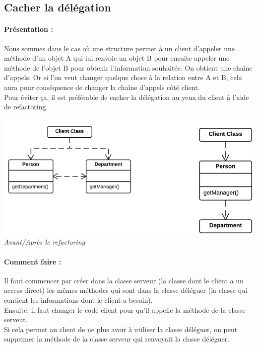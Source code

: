 \documentclass[a4paper,twoside,12pt,openright]{report}
\begin{document}
\newpage

\subsection{Cacher la délégation}
\paragraph{Présentation :}
Nous sommes dans le cas où une structure permet à un client d'appeler une méthode d'un objet A qui lui renvoie un objet B pour ensuite appeler une méthode de l'objet B pour obtenir l'information souhaitée. On obtient une chaîne d'appels. Or si l'on veut changer quelque chose à la relation entre A et B, cela aura pour conséquence de changer la chaîne d'appels côté client.\\
Pour éviter ça, il est préférable de cacher la délégation au yeux du client à l'aide de refactoring.

\begin{center}
\includegraphics[scale=0.7]{Image/Cacher_Delegation.png}\\
\itshape{Avant/Après le refactoring \cite{ref5}}
\end{center}

\paragraph{Comment faire :}
Il faut commencer par créer dans la classe serveur (la classe dont le client a un access direct) les mêmes méthodes qui sont dans la classe déléguer (la classe qui contient les informations dont le client a besoin).\\
Ensuite, il faut changer le code client pour qu'il appelle la méthode de la classe serveur.\\
Si cela permet au client de ne plus avoir à utiliser la classe déléguer, on peut supprimer la méthode de la classe serveur qui renvoyait la classe déléguer.
\end{document}
